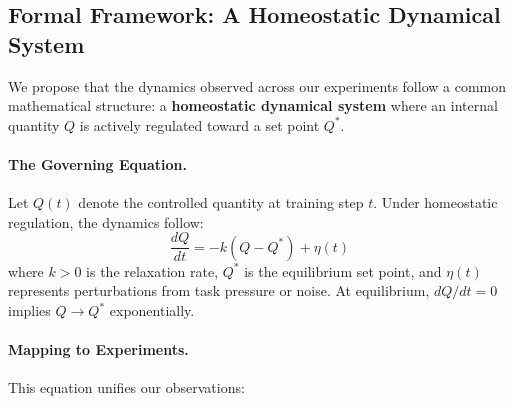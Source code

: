 \subsection{Formal Framework: A Homeostatic Dynamical System}\label{sec:framework}

We propose that the dynamics observed across our experiments follow a common mathematical structure: a \textbf{homeostatic dynamical system} where an internal quantity $Q$ is actively regulated toward a set point $Q^*$.

\paragraph{The Governing Equation.}
Let $Q(t)$ denote the controlled quantity at training step $t$. Under homeostatic regulation, the dynamics follow:
\begin{equation}
\frac{dQ}{dt} = -k(Q - Q^*) + \eta(t)
\label{eq:homeostasis}
\end{equation}
where $k > 0$ is the relaxation rate, $Q^*$ is the equilibrium set point, and $\eta(t)$ represents perturbations from task pressure or noise. At equilibrium, $dQ/dt = 0$ implies $Q \to Q^*$ exponentially.

\paragraph{Mapping to Experiments.}
This equation unifies our observations:

